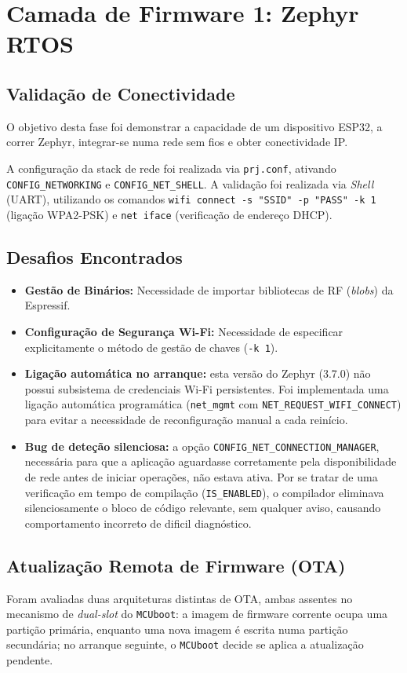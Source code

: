 \documentclass[a4paper,12pt]{article}
\begin{document}
\section{Camada de Firmware 1: Zephyr RTOS}

\subsection{Validação de Conectividade}
O objetivo desta fase foi demonstrar a capacidade de um dispositivo ESP32, a correr Zephyr, integrar-se numa rede sem fios e obter conectividade IP.

A configuração da stack de rede foi realizada via \texttt{prj.conf}, ativando \texttt{CONFIG\_NETWORKING} e \texttt{CONFIG\_NET\_SHELL}. A validação foi realizada via \textit{Shell} (UART), utilizando os comandos \texttt{wifi connect -s "SSID" -p "PASS" -k 1} (ligação WPA2-PSK) e \texttt{net iface} (verificação de endereço DHCP).

\subsection{Desafios Encontrados}
\begin{itemize}
    \item \textbf{Gestão de Binários:} Necessidade de importar bibliotecas de RF (\textit{blobs}) da Espressif.
    \item \textbf{Configuração de Segurança Wi-Fi:} Necessidade de especificar explicitamente o método de gestão de chaves (\texttt{-k 1}).
    \item \textbf{Ligação automática no arranque:} esta versão do Zephyr (3.7.0) não possui subsistema de credenciais Wi-Fi persistentes. Foi implementada uma ligação automática programática (\texttt{net\_mgmt} com \texttt{NET\_REQUEST\_WIFI\_CONNECT}) para evitar a necessidade de reconfiguração manual a cada reinício.
    \item \textbf{Bug de deteção silenciosa:} a opção \texttt{CONFIG\_NET\_CONNECTION\_MANAGER}, necessária para que a aplicação aguardasse corretamente pela disponibilidade de rede antes de iniciar operações, não estava ativa. Por se tratar de uma verificação em tempo de compilação (\texttt{IS\_ENABLED}), o compilador eliminava silenciosamente o bloco de código relevante, sem qualquer aviso, causando comportamento incorreto de dificil diagnóstico.
\end{itemize}

\subsection{Atualização Remota de Firmware (OTA)}
Foram avaliadas duas arquiteturas distintas de OTA, ambas assentes no mecanismo de \textit{dual-slot} do \texttt{MCUboot}: a imagem de firmware corrente ocupa uma partição primária, enquanto uma nova imagem é escrita numa partição secundária; no arranque seguinte, o \texttt{MCUboot} decide se aplica a atualização pendente.
\end{document}
